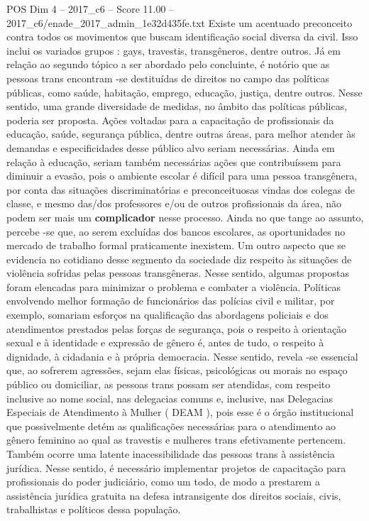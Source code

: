 \begin{textsample}{POS Dim 4 – 2017\_c6 – Score 11.00 – 2017\_c6/enade\_2017\_admin\_1e32d435fe.txt}
Existe um acentuado preconceito contra todos os movimentos que buscam identificação social diversa da civil.
Isso inclui os variados grupos : gays, travestis, transgêneros, dentre outros.
Já em relação ao segundo tópico a ser abordado pelo concluinte, é notório que as pessoas trans encontram -se destituídas de direitos no campo das políticas públicas, como saúde, habitação, emprego, educação, justiça, dentre outros.
Nesse sentido, uma grande diversidade de medidas, no âmbito das políticas públicas, poderia ser proposta.
Ações voltadas para a capacitação de profissionais da educação, saúde, segurança pública, dentre outras áreas, para melhor atender às demandas e especificidades desse público alvo seriam necessárias.
Ainda em relação à educação, seriam também necessárias ações que contribuíssem para diminuir a evasão, pois o ambiente escolar é difícil para uma pessoa transgênera, por conta das situações discriminatórias e preconceituosas vindas dos colegas de classe, e mesmo das/dos professores e/ou de outros profissionais da área, não podem ser mais um \textbf{complicador} nesse processo.
Ainda no que tange ao assunto, percebe -se que, ao serem excluídas dos bancos escolares, as oportunidades no mercado de trabalho formal praticamente inexistem.
Um outro aspecto que se evidencia no cotidiano desse segmento da sociedade diz respeito às situações de violência sofridas pelas pessoas transgêneras.
Nesse sentido, algumas propostas foram elencadas para minimizar o problema e combater a violência.
Políticas envolvendo melhor formação de funcionários das polícias civil e militar, por exemplo, somariam esforços na qualificação das abordagens policiais e dos atendimentos prestados pelas forças de segurança, pois o respeito à orientação sexual e à identidade e expressão de gênero é, antes de tudo, o respeito à dignidade, à cidadania e à própria democracia.
Nesse sentido, revela -se essencial que, ao sofrerem agressões, sejam elas físicas, psicológicas ou morais no espaço público ou domiciliar, as pessoas trans possam ser atendidas, com respeito inclusive ao nome social, nas delegacias comuns e, inclusive, nas Delegacias Especiais de Atendimento à Mulher ( DEAM ), pois esse é o órgão institucional que possivelmente detém as qualificações necessárias para o atendimento ao gênero feminino ao qual as travestis e mulheres trans efetivamente pertencem.
Também ocorre uma latente inacessibilidade das pessoas trans à assistência jurídica.
Nesse sentido, é necessário implementar projetos de capacitação para profissionais do poder judiciário, como um todo, de modo a prestarem a assistência jurídica gratuita na defesa intransigente dos direitos sociais, civis, trabalhistas e políticos dessa população.

\end{textsample}
